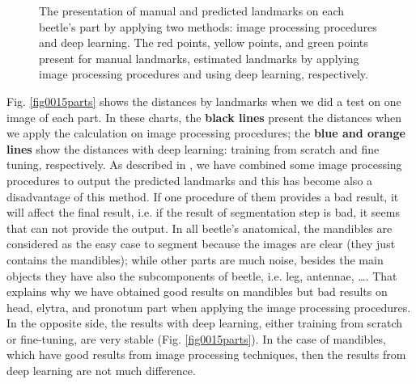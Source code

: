 \documentclass[review]{elsarticle}
\begin{document}
\begin{figure}[htbp]
    \caption{The presentation of manual and predicted landmarks on each beetle's part by applying two methods: image processing procedures and deep learning. The red points, yellow points, and green points present for manual landmarks, estimated landmarks by applying image processing procedures and using deep learning, respectively. }
    \label{figmn5parts}
\end{figure}

Fig. \ref{fig0015parts} shows the distances by landmarks when we did a test on one image of each part. In these charts, the \textbf{black lines} present the distances when we apply the calculation on image processing procedures; the \textbf{blue and orange lines} show the distances with deep learning: training from scratch and fine tuning, respectively. As described in \cite{le2017maelab}, we have combined some image processing procedures to output the predicted landmarks and this has become also a disadvantage of this method. If one procedure of them provides a bad result, it will affect the final result, i.e. if the result of segmentation step is bad, it seems that can not provide the output. In all beetle's anatomical, the mandibles are considered as the easy case to segment because the images are clear (they just contains the mandibles); while other parts are much noise, besides the main objects they have also the subcomponents of beetle, i.e. leg, antennae, \ldots. That explains why we have obtained good results on mandibles but bad results on head, elytra, and pronotum part when applying the image processing procedures. In the opposite side, the results with deep learning, either training from scratch or fine-tuning, are very stable (Fig. \ref{fig0015parts}). In the case of mandibles, which have good results from image processing techniques, then the results from deep learning are not much difference.
\end{document}
